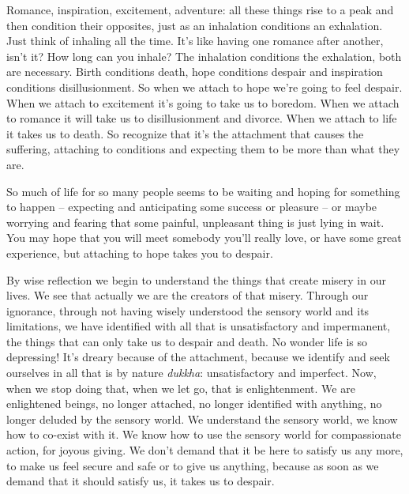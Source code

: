 Romance, inspiration, excitement, adventure: all these things rise to a peak and then condition their opposites, just as an inhalation conditions an exhalation. Just think of inhaling all the time. It's like having one romance after another, isn't it? How long can you inhale? The inhalation conditions the exhalation, both are necessary. Birth conditions death, hope conditions despair and inspiration conditions disillusionment. So when we attach to hope we're going to feel despair. When we attach to excitement it's going to take us to boredom. When we attach to romance it will take us to disillusionment and divorce. When we attach to life it takes us to death. So recognize that it's the attachment that causes the suffering, attaching to conditions and expecting them to be more than what they are.

So much of life for so many people seems to be waiting and hoping for something to happen -- expecting and anticipating some success or pleasure -- or maybe worrying and fearing that some painful, unpleasant thing is just lying in wait. You may hope that you will meet somebody you'll really love, or have some great experience, but attaching to hope takes you to despair.

By wise reflection we begin to understand the things that create misery in our lives. We see that actually we are the creators of that misery. Through our ignorance, through not having wisely understood the sensory world and its limitations, we have identified with all that is unsatisfactory and impermanent, the things that can only take us to despair and death. No wonder life is so depressing! It's dreary because of the attachment, because we identify and seek ourselves in all that is by nature \textit{dukkha}: unsatisfactory and imperfect. Now, when we stop doing that, when we let go, that is enlightenment. We are enlightened beings, no longer attached, no longer identified with anything, no longer deluded by the sensory world. We understand the sensory world, we know how to co-exist with it. We know how to use the sensory world for compassionate action, for joyous giving. We don't demand that it be here to satisfy us any more, to make us feel secure and safe or to give us anything, because as soon as we demand that it should satisfy us, it takes us to despair.

